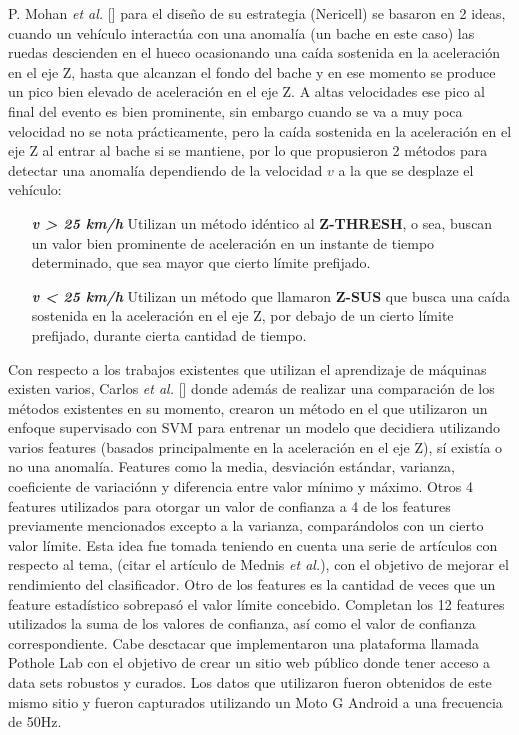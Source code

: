 P. Mohan {\it et al.} [] para el diseño de su estrategia (Nericell) se basaron en 2 ideas, cuando un vehículo interactúa con una
anomalía (un bache en este caso) las ruedas descienden en el hueco ocasionando una caída sostenida en la aceleración en el eje Z,
hasta que alcanzan el fondo del bache y en ese momento se produce un pico bien elevado de aceleración en el eje Z. A altas velocidades
ese pico al final del evento es bien prominente, sin embargo cuando se va a muy poca velocidad no se nota prácticamente, pero la caída
sostenida en la aceleración en el eje Z al entrar al bache si se mantiene, por lo que propusieron 2 métodos para detectar una anomalía
dependiendo de la velocidad $v$ a la que se desplaze el vehículo:\\

\begin{enumerate}
	\item [ \textbf {\it v > 25 km/h} ] Utilizan un método idéntico al \textbf {Z-THRESH}, o sea, buscan un valor bien prominente de
		aceleración en un instante de tiempo determinado, que sea mayor que cierto límite prefijado.\\
	\item [ \textbf {\it v < 25 km/h} ] Utilizan un método que llamaron \textbf {Z-SUS} que busca una caída sostenida en la aceleración
		en el eje Z, por debajo de un cierto límite prefijado, durante cierta cantidad de tiempo.\\
\end{enumerate}

Con respecto a los trabajos existentes que utilizan el aprendizaje de máquinas existen varios, Carlos {\it et al.} [] donde además de realizar 
una comparación de los métodos existentes en su momento, crearon un método en el que utilizaron un enfoque supervisado con SVM para entrenar 
un modelo que decidiera utilizando varios features (basados principalmente en la aceleración en el eje Z), sí existía o no una anomalía. Features
como la media, desviación estándar, varianza, coeficiente de variaciónn y diferencia entre valor mínimo y máximo. Otros 4 features utilizados para
otorgar un valor de confianza a 4 de los features previamente mencionados excepto a la varianza, comparándolos con un cierto valor límite. Esta idea
fue tomada teniendo en cuenta una serie de artículos con respecto al tema, (citar el artículo de Mednis {\it et al.}), con el objetivo de mejorar el rendimiento
del clasificador. Otro de los features es la cantidad de veces que un feature estadístico sobrepasó el valor límite concebido. Completan los 12 features
utilizados la suma de los valores de confianza, así como el valor de confianza correspondiente. Cabe desctacar que implementaron una plataforma llamada 
Pothole Lab con el objetivo de crear un sitio web público donde tener acceso a data sets robustos y curados. Los datos que utilizaron fueron obtenidos de este
mismo sitio y fueron capturados utilizando un Moto G Android a una frecuencia de 50Hz.\\

